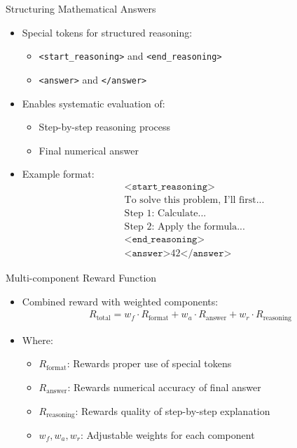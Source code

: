 \documentclass{beamer}
\newcommand{\specialtoken}[1]{\texttt{<#1>}}
\begin{document}
\begin{frame}{Structuring Mathematical Answers}
  \begin{itemize}
    \item Special tokens for structured reasoning:
    \begin{itemize}
      \item \specialtoken{start\_reasoning} and \specialtoken{end\_reasoning}
      \item \specialtoken{answer} and \specialtoken{/answer}
    \end{itemize}
    \item Enables systematic evaluation of:
    \begin{itemize}
      \item Step-by-step reasoning process
      \item Final numerical answer
    \end{itemize}
    \item Example format:
    \begin{align*}
    &\specialtoken{start\_reasoning}\\
    &\text{To solve this problem, I'll first...}\\
    &\text{Step 1: Calculate...}\\
    &\text{Step 2: Apply the formula...}\\
    &\specialtoken{end\_reasoning}\\
    &\specialtoken{answer}42\specialtoken{/answer}
    \end{align*}
  \end{itemize}
\end{frame}

\begin{frame}{Multi-component Reward Function}
  \begin{itemize}
    \item Combined reward with weighted components:
    \begin{align*}
    R_{\text{total}} = w_f \cdot R_{\text{format}} + w_a \cdot R_{\text{answer}} + w_r \cdot R_{\text{reasoning}}
    \end{align*}
    \item Where:
    \begin{itemize}
      \item $R_{\text{format}}$: Rewards proper use of special tokens
      \item $R_{\text{answer}}$: Rewards numerical accuracy of final answer
      \item $R_{\text{reasoning}}$: Rewards quality of step-by-step explanation
      \item $w_f, w_a, w_r$: Adjustable weights for each component
    \end{itemize}
  \end{itemize}
\end{frame}
\end{document}
